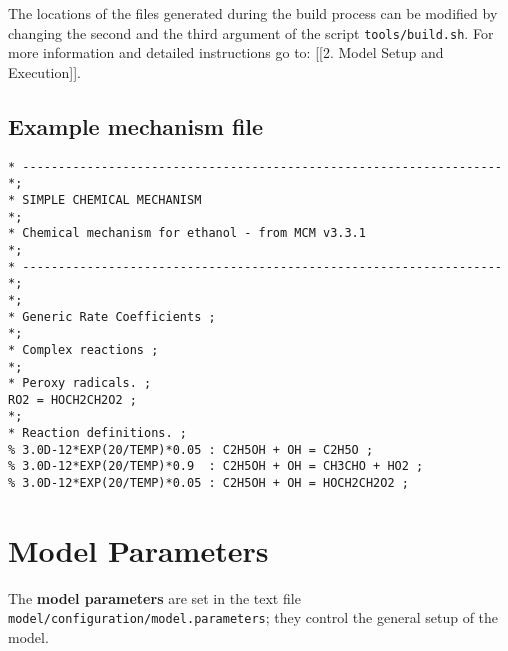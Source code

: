 The locations of the files generated during the build process can be
modified by changing the second and the third argument of the script
\texttt{tools/build.sh}. For more information and detailed
instructions go to: {[}{[}2. Model Setup and Execution{]}{]}.

\subsection{Example mechanism file} \label{subsec:example-mechanism-file}

\begin{verbatim}
* ------------------------------------------------------------------- *;
* SIMPLE CHEMICAL MECHANISM                                           *;
* Chemical mechanism for ethanol - from MCM v3.3.1                    *;
* ------------------------------------------------------------------- *;
*;
* Generic Rate Coefficients ;
*;
* Complex reactions ;
*;
* Peroxy radicals. ;
RO2 = HOCH2CH2O2 ;
*;
* Reaction definitions. ;
% 3.0D-12*EXP(20/TEMP)*0.05 : C2H5OH + OH = C2H5O ;
% 3.0D-12*EXP(20/TEMP)*0.9  : C2H5OH + OH = CH3CHO + HO2 ;
% 3.0D-12*EXP(20/TEMP)*0.05 : C2H5OH + OH = HOCH2CH2O2 ;
\end{verbatim}

\section{Model Parameters} \label{sec:parameters}

The \textbf{model parameters} are set in the text file
\texttt{model/configuration/model.parameters}; they control the general
setup of the model.

